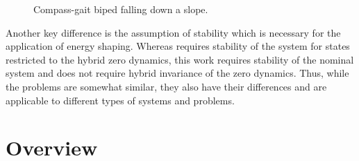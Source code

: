 \begin{figure}
  \centering
  \def\svgwidth{.5\columnwidth}
  
  \caption{Compass-gait biped falling down a slope.}
  \label{fig:compass_gait_slope_model}
\end{figure}

Another key difference is the assumption of stability which is necessary for the
application of energy shaping.
% 
Whereas \cite{Ames2014} requires stability of the system for states restricted
to the hybrid zero dynamics, this work requires stability of the nominal system
and does not require hybrid invariance of the zero dynamics.
% 
Thus, while the problems are somewhat similar, they also have their differences
and are applicable to different types of systems and problems.

\section{Overview}

